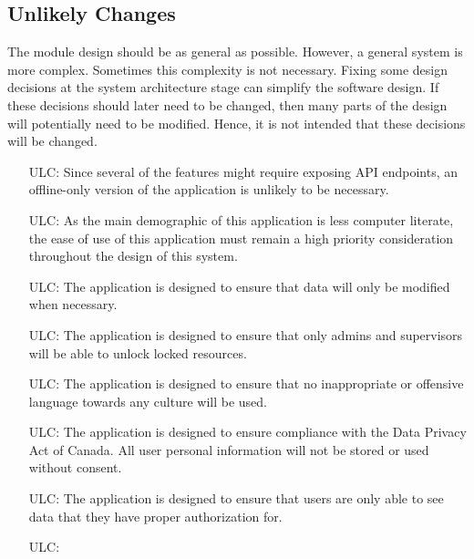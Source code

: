 \documentclass[12pt, titlepage]{article}
\newcounter{ucnum}
\begin{document}
\subsection{Unlikely Changes} \label{SecUchange}

The module design should be as general as possible. However, a general system is
more complex. Sometimes this complexity is not necessary. Fixing some design
decisions at the system architecture stage can simplify the software design. If
these decisions should later need to be changed, then many parts of the design
will potentially need to be modified. Hence, it is not intended that these
decisions will be changed.

\noindent \begin{itemize}

\item[ULC\refstepcounter{ucnum}\theucnum\label{ULC_meaningfulLabel}:] 
Since several of the features might require exposing API endpoints, an offline-only version of the application is unlikely to be necessary. 
\item[ULC\refstepcounter{ucnum}\theucnum\label{ULC_meaningfulLabel}:] 
As the main demographic of this application is less computer literate, the ease of use of this application must remain a high priority consideration throughout the design of this system.
\item[ULC\refstepcounter{ucnum}\theucnum\label{ULC_meaningfulLabel}:] 
The application is designed to ensure that data will only be modified when necessary. 
\item[ULC\refstepcounter{ucnum}\theucnum\label{ULC_meaningfulLabel}:] 
The application is designed to ensure that only admins and supervisors will be able to unlock locked resources.
\item[ULC\refstepcounter{ucnum}\theucnum\label{ULC_meaningfulLabel}:] 
The application is designed to ensure that no inappropriate or offensive language towards any culture will be used.
\item[ULC\refstepcounter{ucnum}\theucnum\label{ULC_meaningfulLabel}:] 
The application is designed to ensure compliance with the Data Privacy Act of Canada. All user personal information will not be stored or used without consent. 
\item[ULC\refstepcounter{ucnum}\theucnum\label{ULC_meaningfulLabel}:] 
The application is designed to ensure that users are only able to see data that they have proper authorization for.
\item[ULC\refstepcounter{ucnum}\theucnum\label{ULC_meaningfulLabel}:] 

\end{itemize}
\end{document}
